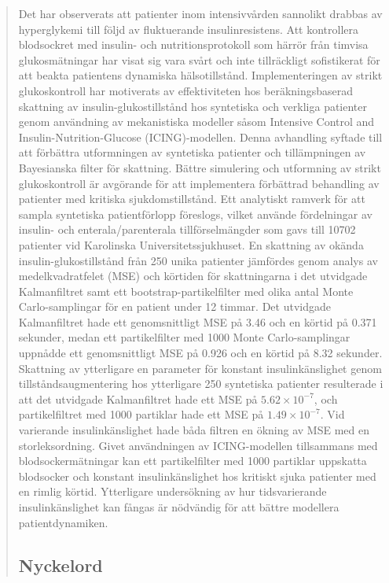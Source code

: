 \documentclass[nomenclature, english, bibtex]{kththesis}
\newcommand*{\sweExpl}[1]{\todo[inline, backgroundcolor=kth-lightblue40]{#1}}  %
\begin{document}
\begin{abstract}
\begin{scontents}[store-env=abstracts,print-env=true]
Det har observerats att patienter inom intensivvården sannolikt drabbas av hyperglykemi till följd av fluktuerande insulinresistens. Att kontrollera blodsockret med insulin- och nutritionsprotokoll som härrör från timvisa glukosmätningar har visat sig vara svårt och inte tillräckligt sofistikerat för att beakta patientens dynamiska hälsotillstånd. Implementeringen av strikt glukoskontroll har motiverats av effektiviteten hos beräkningsbaserad skattning av insulin-glukostillstånd hos syntetiska och verkliga patienter genom användning av mekanistiska modeller såsom Intensive Control and Insulin-Nutrition-Glucose (\gls{ICING})-modellen. Denna avhandling syftade till att förbättra utformningen av syntetiska patienter och tillämpningen av Bayesianska filter för skattning. Bättre simulering och utformning av strikt glukoskontroll är avgörande för att implementera förbättrad behandling av patienter med kritiska sjukdomstillstånd. Ett analytiskt ramverk för att sampla syntetiska patientförlopp föreslogs, vilket använde fördelningar av insulin- och enterala/parenterala tillförselmängder som gavs till 10702 patienter vid Karolinska Universitetssjukhuset. En skattning av okända insulin-glukostillstånd från 250 unika patienter jämfördes genom analys av medelkvadratfelet (\gls{MSE}) och körtiden för skattningarna i det utvidgade Kalmanfiltret samt ett bootstrap-partikelfilter med olika antal Monte Carlo-samplingar för en patient under 12 timmar. Det utvidgade Kalmanfiltret hade ett genomsnittligt \gls{MSE} på 3.46 och en körtid på 0.371 sekunder, medan ett partikelfilter med 1000 Monte Carlo-samplingar uppnådde ett genomsnittligt \gls{MSE} på 0.926 och en körtid på 8.32 sekunder. Skattning av ytterligare en parameter för konstant insulinkänslighet genom tillståndsaugmentering hos ytterligare 250 syntetiska patienter resulterade i att det utvidgade Kalmanfiltret hade ett \gls{MSE} på $5.62 \times 10^{-7}$, och partikelfiltret med 1000 partiklar hade ett \gls{MSE} på $1.49 \times 10^{-7}.$ Vid varierande insulinkänslighet hade båda filtren en ökning av \gls{MSE} med en storleksordning. Givet användningen av \gls{ICING}-modellen tillsammans med blodsockermätningar kan ett partikelfilter med 1000 partiklar uppskatta blodsocker och konstant insulinkänslighet hos kritiskt sjuka patienter med en rimlig körtid. Ytterligare undersökning av hur tidsvarierande insulinkänslighet kan fångas är nödvändig för att bättre modellera patientdynamiken.



\end{scontents}
\subsection*{Nyckelord}
\begin{scontents}[store-env=keywords,print-env=true]
\end{scontents}
\end{abstract}
\end{document}
